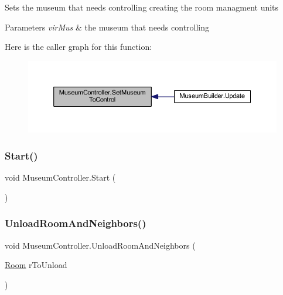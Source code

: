Sets the museum that needs controlling creating the room managment units 


\begin{DoxyParams}{Parameters}
{\em vir\+Mus} & the museum that needs controlling\\
\hline
\end{DoxyParams}
Here is the caller graph for this function\+:
\nopagebreak
\begin{figure}[H]
\begin{center}
\leavevmode
\includegraphics[width=350pt]{class_museum_controller_a276d26ec047cda4e6f36b29fb673d968_icgraph}
\end{center}
\end{figure}
\mbox{\label{class_museum_controller_a3c48dd82fe1c3b55ee978ced6095f84e}} 
\subsubsection{\texorpdfstring{Start()}{Start()}}
{\footnotesize\ttfamily void Museum\+Controller.\+Start (\begin{DoxyParamCaption}{ }\end{DoxyParamCaption})\hspace{0.3cm}{\ttfamily [private]}}

\mbox{\label{class_museum_controller_aa65b2ea9f99d62431282233f0582fc4a}} 
\subsubsection{\texorpdfstring{Unload\+Room\+And\+Neighbors()}{UnloadRoomAndNeighbors()}}
{\footnotesize\ttfamily void Museum\+Controller.\+Unload\+Room\+And\+Neighbors (\begin{DoxyParamCaption}\item[{\mbox{\hyperlink{class_room}{Room}}}]{r\+To\+Unload }\end{DoxyParamCaption})\hspace{0.3cm}{\ttfamily [private]}}



